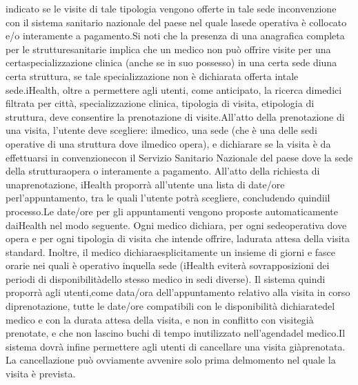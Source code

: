 \documentclass{homework}
\begin{document}
indicato se le visite di tale tipologia vengono offerte in tale sede inconvenzione con il sistema sanitario nazionale del paese nel quale lasede operativa è collocato e/o interamente a pagamento.Si noti che la presenza di una anagrafica completa per le strutturesanitarie implica che un medico non può offrire visite per una certaspecializzazione clinica (anche se in suo possesso) in una certa sede diuna certa struttura, se tale specializzazione non è dichiarata offerta intale sede.iHealth, oltre a permettere agli utenti, come anticipato, la ricerca dimedici filtrata per città, specializzazione clinica, tipologia di visita, etipologia di struttura, deve consentire la prenotazione di visite.All'atto   della   prenotazione   di   una   visita,   l'utente   deve   scegliere:   ilmedico, una sede (che è una delle sedi operative di una struttura dove ilmedico opera), e dichiarare se la visita è da effettuarsi in convenzionecon il Servizio Sanitario Nazionale del paese dove la sede della strutturaopera   o   interamente   a   pagamento.   All'atto   della   richiesta   di   unaprenotazione,   iHealth   proporrà   all'utente   una   lista   di   date/ore   perl'appuntamento, tra le quali l'utente potrà scegliere, concludendo quindiil processo.Le date/ore per gli appuntamenti vengono proposte automaticamente daiHealth   nel   modo   seguente.   Ogni   medico   dichiara,   per   ogni   sedeoperativa dove opera e per ogni tipologia di visita che intende offrire, ladurata   attesa   della   visita   standard.   Inoltre,   il   medico   dichiaraesplicitamente un insieme di giorni e fasce orarie nei quali è operativo inquella sede (iHealth eviterà sovrapposizioni dei periodi di disponibilitàdello stesso medico in sedi diverse). Il sistema quindi proporrà agli utenti,come   data/ora   dell'appuntamento   relativo   alla   visita   in   corso   diprenotazione, tutte le date/ore compatibili con le disponibilità dichiaratedel medico e con la durata attesa della visita, e non in conflitto con visitegià prenotate, e che non lascino buchi di tempo inutilizzato nell'agendadel medico.Il sistema dovrà infine permettere agli utenti di cancellare una visita giàprenotata. La cancellazione può ovviamente avvenire solo prima delmomento nel quale la visita è prevista.
\end{document}
